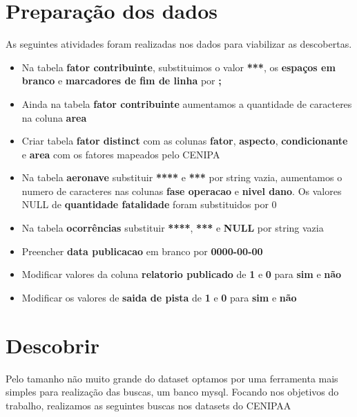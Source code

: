 \documentclass[conference]{IEEEtran}
\begin{document}
\section{Preparação dos dados}

As seguintes atividades foram realizadas nos dados para viabilizar as descobertas.

\begin{itemize}
 \item Na tabela \textbf{fator contribuinte}, substituimos o valor \textbf{***}, os \textbf{espaços em branco} e \textbf{marcadores de fim de linha} por \textbf{;}
 \item Ainda na tabela \textbf{fator contribuinte} aumentamos a quantidade de caracteres na coluna \textbf{area}
 \item Criar tabela \textbf{fator distinct} com as colunas \textbf{fator}, \textbf{aspecto}, \textbf{condicionante} e \textbf{area} com os fatores mapeados pelo CENIPA
 \item Na tabela \textbf{aeronave} substituir \textbf{****} e \textbf{***} por string vazia, aumentamos o numero de caracteres nas colunas \textbf{fase operacao} e \textbf{nivel dano}. Os valores NULL de \textbf{quantidade fatalidade} foram substituidos por 0 
 \item Na tabela \textbf{ocorrências} substituir \textbf{****}, \textbf{***} e \textbf{NULL} por string vazia
 \item Preencher \textbf{data publicacao} em branco por \textbf{0000-00-00}
 \item Modificar valores da coluna \textbf{relatorio publicado} de \textbf{1} e \textbf{0} para \textbf{sim} e \textbf{não}
 \item Modificar os valores de \textbf{saida de pista} de \textbf{1} e \textbf{0} para \textbf{sim} e \textbf{não}
\end{itemize}

\section{Descobrir}

Pelo tamanho não muito grande do dataset optamos por uma ferramenta mais simples para realização das buscas, um banco mysql. Focando nos objetivos do trabalho, realizamos 
as seguintes buscas nos datasets do CENIPAA\\
\end{document}
